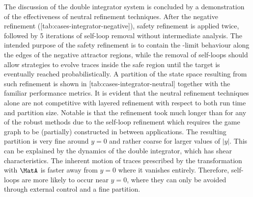     The discussion of the double integrator system is concluded by a demonstration of the effectiveness of neutral refinement techniques.
    After the negative refinement ([tab:cases-integrator-negative]), safety refinement is applied twice, followed by 5 iterations of self-loop removal without intermediate analysis.
    The intended purpose of the safety refinement is to contain the \epsilon-limit behaviour along the edges of the negative attractor regions, while the removal of self-loops should allow strategies to evolve traces inside the safe region until the target is eventually reached probabilistically.
    A partition of the state space resulting from such refinement is shown in [tab:cases-integrator-neutral] together with the familiar performance metrics.
    It is evident that the neutral refinement techniques alone are not competitive with layered refinement with respect to both run time and partition size.
    Notable is that the refinement took much longer than for any of the robust methods due to the self-loop refinement which requires the game graph to be (partially) constructed in between applications.
    The resulting partition is very fine around $y = 0$ and rather coarse for larger values of $|y|$.
    This can be explained by the dynamics of the double integrator, which has shear characteristics.
    The inherent motion of traces prescribed by the transformation with $\MatA$ is faster away from $y = 0$ where it vanishes entirely.
    Therefore, self-loops are more likely to occur near $y = 0$, where they can only be avoided through external control and a fine partition.

\stopsubsection

